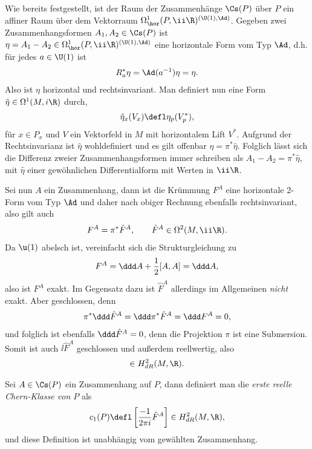 \documentclass[%
	paper=a5,%
	fleqn,%
	DIV=18,%
	BCOR=0mm,
	fontsize=11pt,
	titlepage=false,%
	bibliography=totoc,
	DIV=18,%
	twoside=true,
	pdftitle=Riemannsche Geometrie,
	pdfauthor=Uwe Semmelmann,
	numbers=noendperiod]%
	{scrbook}
\begin{document}
Wie bereits festgestellt, ist der Raum der Zusammenhänge $\Cs(P)$ über $P$ ein
affiner Raum über dem Vektorraum $\Omega^1_\hor(P,\ii\R)^{(\U(1),\Ad)}$. Gegeben
zwei Zusammenhangsformen $A_1,A_2\in\Cs(P)$ ist $\eta =
A_1-A_2\in\Omega^1_\hor(P,\ii\R)^{(\U(1),\Ad)}$ eine horizontale Form vom Typ
$\Ad$, d.h. für jedes $a\in\U(1)$ ist
\begin{align*}
R_a^*\eta = \Ad(a^{-1})\eta = \eta.
\end{align*}
Also ist $\eta$ horizontal und rechtsinvariant. Man definiert nun eine Form
$\hat{\eta}\in\Omega^1(M,i\R)$ durch,
\begin{align*}
\hat{\eta}_x(V_x) \defl \eta_p(V^*_p),
\end{align*}
für $x\in P_x$ und $V$ ein Vektorfeld in $M$ mit horizontalem Lift $V^*$.
Aufgrund der Rechtsinvarianz ist $\hat{\eta}$ wohldefiniert und es gilt
offenbar $\eta = \pi^*\hat{\eta}$. Folglich lässt sich die Differenz
zweier Zusammenhangsformen immer schreiben als $A_1-A_2 = \pi^* \hat{\eta}$, mit
$\hat{\eta}$ einer gewöhnlichen Differentialform mit Werten in $\ii\R$.

Sei nun $A$ ein Zusammenhang, dann ist die Krümmung $F^A$ eine horizontale
2-Form vom Typ $\Ad$ und daher nach obiger Rechnung ebenfalls rechtsinvariant,
also gilt auch
\begin{align*}
F^A = \pi^*\hat{F}^A,\qquad \hat{F}^A\in\Omega^2(M,\ii\R).
\end{align*}
Da $\u(1)$ abelsch ist, vereinfacht sich die Strukturgleichung zu
\begin{align*}
F^A = \ddd A + \frac{1}{2}[A,A] = \ddd A,
\end{align*}
also ist $F^A$ exakt. Im Gegensatz dazu ist
$\hat{F}^A$ allerdings im Allgemeinen \textit{nicht} exakt. Aber geschlossen, denn
\begin{align*}
\pi^*\ddd \hat{F}^A = \ddd\pi^* \hat{F}^A = \ddd F^A = 0,
\end{align*}
und folglich ist ebenfalls $\ddd \hat{F}^A = 0$, denn die Projektion
$\pi$ ist eine Submersion. Somit ist auch $\ii\hat{F}^A$ geschlossen und
außerdem reellwertig, also
\begin{align*}
[\ii \hat{F}^A]\in H_{dR}^2(M,\R).
\end{align*}

\begin{defn}
\label{defn:Erste-Chern-Klasse}
Sei $A\in\Cs(P)$ ein Zusammenhang auf $P$, dann definiert man die
\emph{erste reelle Chern-Klasse von $P$} als
\begin{align*}
c_1(P)\defl \left[\frac{-1}{2\pi i} \hat{F}^A \right] \in H^2_{dR}(M,\R),
\end{align*}
und diese Definition ist unabhängig vom gewählten Zusammenhang.\fish
\end{defn}
\end{document}
